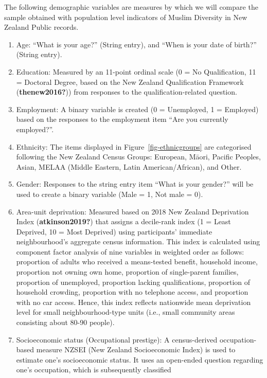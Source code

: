 \documentclass[
]{interact}
\providecommand{\tightlist}{%
  \setlength{\itemsep}{0pt}\setlength{\parskip}{0pt}}\usepackage{longtable,booktabs,array}
\begin{document}
The following demographic variables are measures by which we will
compare the sample obtained with population level indicators of Muslim
Diversity in New Zealand Public records.

\begin{enumerate}
\def\labelenumi{\arabic{enumi}.}
\tightlist
\item
  Age: ``What is your age?'' (String entry), and ``When is your date of
  birth?'' (String entry).
\item
  Education: Measured by an 11-point ordinal scale (0 = No
  Qualification, 11 = Doctoral Degree, based on the New Zealand
  Qualification Framework (\textbf{thenew2016?})) from responses to the
  qualification-related question.
\item
  Employment: A binary variable is created (0 = Unemployed, 1 =
  Employed) based on the responses to the employment item ``Are you
  currently employed?''.
\item
  Ethnicity: The items displayed in Figure~\ref{fig-ethnicgroups} are
  categorised following the New Zealand Census Groups: European, Māori,
  Pacific Peoples, Asian, MELAA (Middle Eastern, Latin
  American/African), and Other.
\item
  Gender: Responses to the string entry item ``What is your gender?''
  will be used to create a binary variable (Male = 1, Not male = 0).
\item
  Area-unit deprivation: Measured based on 2018 New Zealand Deprivation
  Index (\textbf{atkinson2019?}) that assigns a decile-rank index (1 =
  Least Deprived, 10 = Most Deprived) using participants' immediate
  neighbourhood's aggregate census information. This index is calculated
  using component factor analysis of nine variables in weighted order as
  follows: proportion of adults who received a means-tested benefit,
  household income, proportion not owning own home, proportion of
  single-parent families, proportion of unemployed, proportion lacking
  qualifications, proportion of household crowding, proportion with no
  telephone access, and proportion with no car access. Hence, this index
  reflects nationwide mean deprivation level for small
  neighbourhood-type units (i.e., small community areas consisting about
  80-90 people).
\item
  Socioeconomic status (Occupational prestige): A census-derived
  occupation-based measure NZSEI (New Zealand Socioeconomic Index) is
  used to estimate one's socioeconomic status. It uses an open-ended
  question regarding one's occupation, which is subsequently classified

\end{enumerate}
\end{document}
